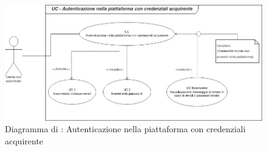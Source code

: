 
\begin{figure}[H]
	\centering
	\includegraphics[scale=0.6]{Immagini/DiagrammiUC/AccessoAcquirente.png}
	\caption{Diagramma di \actualUC: Autenticazione nella piattaforma con credenziali acquirente} 
	\label{fig:Login}
\end{figure}

